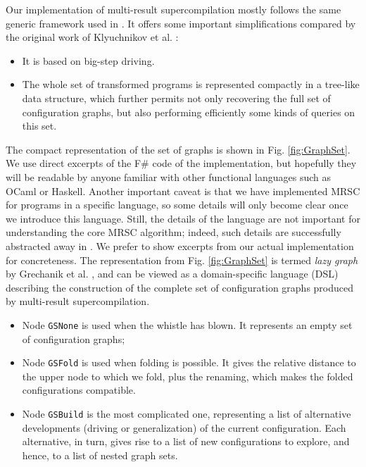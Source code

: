 \documentclass[submission,copyright,creativecommons]{eptcs}
\begin{document}
Our implementation of multi-result supercompilation mostly follows the same
generic framework used in \cite{Romanenko2014StagedMRSC,krustev2014approach}.
It offers some important simplifications compared by the original work
of Klyuchnikov et al. \cite{KlyuchnikovMRSCBranch,Klyuchnikov:META2012:MRSC}:
\begin{itemize}
  \item It is based on big-step driving.
  \item The whole set of transformed programs is represented compactly
    in a tree-like data structure, which further permits not only
    recovering the full set of configuration graphs, but also
    performing efficiently some kinds of queries on this set.
\end{itemize}
The compact representation of the set of graphs is shown in Fig. \ref{fig:GraphSet}.
We use direct excerpts of the F\# code of the implementation, but hopefully
they will be readable by anyone familiar with other functional languages such as OCaml or Haskell.
Another important caveat is that we have implemented MRSC for programs in a specific language,
so some details will only become clear once we introduce this language.
Still, the details of the language are not important for understanding the core
MRSC algorithm; indeed, such details are successfully abstracted away in \cite{Romanenko2014StagedMRSC,krustev2014approach}.
We prefer to show excerpts from our actual implementation for concreteness.
The representation from Fig. \ref{fig:GraphSet} is termed \emph{lazy graph} by Grechanik et al. \cite{Romanenko2014StagedMRSC},
and can be viewed as a domain-specific language (DSL) describing the construction of the
complete set of configuration graphs produced by multi-result supercompilation.
\begin{itemize}
  \item Node \verb|GSNone| is used when the whistle has blown. 
    It represents an empty set of configuration graphs;
  \item Node \verb|GSFold| is used when folding is possible. 
    It gives the relative distance to the upper node to which we fold, 
    plus the renaming, which makes the folded configurations compatible.
  \item Node \verb|GSBuild| is the most complicated one, representing a list
    of alternative developments (driving or generalization) of the current configuration.
    Each alternative, in turn, gives rise to a list of new configurations to explore,
    and hence, to a list of nested graph sets.
\end{itemize}
\end{document}
